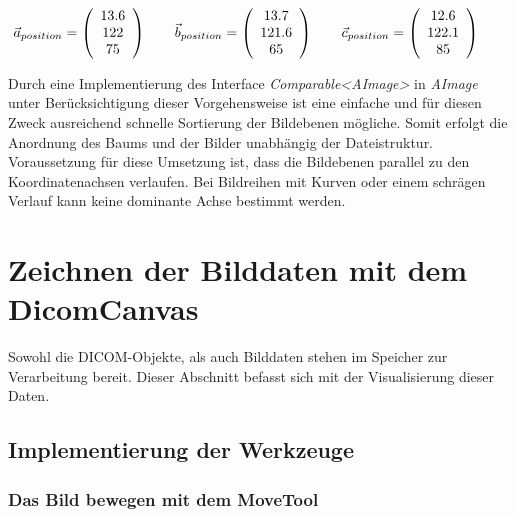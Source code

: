 \begin{equation}
\vec{a}_{position}=\left(\begin{array}{c} 13.6 \\ 122 \\ 75 \end{array}\right) \qquad
\vec{b}_{position}=\left(\begin{array}{c} 13.7 \\ 121.6 \\ 65 \end{array}\right) \qquad
\vec{c}_{position}=\left(\begin{array}{c} 12.6 \\ 122.1 \\ 85 \end{array}\right) \qquad
\vspace{0.5cm}
\label{example_sort}
\end{equation}

Durch eine Implementierung des Interface \textit{Comparable\textless AImage\textgreater} in \textit{AImage} unter Berücksichtigung dieser Vorgehensweise ist eine einfache und für diesen Zweck ausreichend schnelle Sortierung der Bildebenen mögliche. Somit erfolgt die Anordnung des Baums und der Bilder unabhängig der Dateistruktur.\\
Voraussetzung für diese Umsetzung ist, dass die Bildebenen parallel zu den Koordinatenachsen verlaufen. Bei Bildreihen mit Kurven oder einem schrägen Verlauf kann keine dominante Achse bestimmt werden.

\section{Zeichnen der Bilddaten mit dem DicomCanvas}

Sowohl die DICOM-Objekte, als auch Bilddaten stehen im Speicher zur Verarbeitung bereit. Dieser Abschnitt befasst sich mit der Visualisierung dieser Daten.

\subsection{Implementierung der Werkzeuge}

\subsubsection{Das Bild bewegen mit dem MoveTool}

